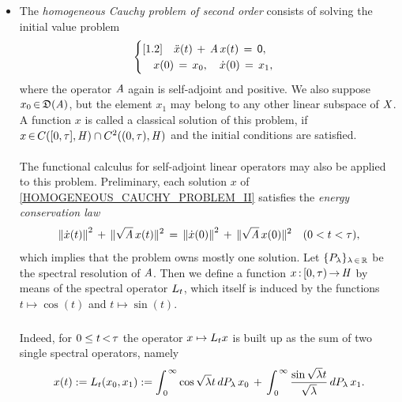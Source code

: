 \documentclass[11pt,twoside]{article}
\begin{document}
\begin{itemize}[leftmargin=12pt,itemsep=2mm,topsep=1mm]
\begin{theorem}\label{EXISTENCE_THEOREM_FOR_ABSTRACT_HEAT_EQUATION}
The function $x\:t \mapsto \linL_t(x_0)$ is continuous in $[0,\infty)$,
continuously differentiable in $(0,\infty)$
and forms a solution of \eqref{HOMOGENEOUS_CAUCHY_PROBLEM_I}.
\end{theorem}

\item[2.] %
The \textit{homogeneous Cauchy problem of second order} consists of solving
the initial value problem
\begin{equation}\label{HOMOGENEOUS_CAUCHY_PROBLEM_II}
\begin{cases}[1.2]
\quad \ddot{x}(t) \,+\, \mathit{A} \, x(t) \,=\, {\mathsf{0}},\\
\quad x(0)  \,=\, x_0,
\quad \dot{x}(0) \,=\, x_1,\\
\end{cases}
\end{equation}
where the operator $\mathit{A}$ again is self-adjoint and positive.
We also suppose $x_0 {\,\in\,} \mathfrak{D}(\mathit{A})$,
but the element $x_1$ may belong to any other linear subspace of $\mathit{X}$.
A function $x$ is called a classical solution of this problem,
if $x {\,\in\,} C([0,\tau],\mathit{H}) \cap C^2((0,\tau),\mathit{H})$
and the initial conditions are satisfied.

\paragraph{} %
The functional calculus for self-adjoint linear operators
may also be applied to this problem.
Preliminary,
each solution $x$ of \eqref{HOMOGENEOUS_CAUCHY_PROBLEM_II} satisfies
the \textit{energy conservation law}
\[
\left\lVert \dot{x}(t) \right\rVert^2 \,+\, \lVert \sqrt{\mathit{A}} \, x(t) \rVert^2
\,=\,
\left\lVert \dot{x}(0) \right\rVert^2 \,+\, \lVert \sqrt{\mathit{A}} \, x(0) \rVert^2
\quad (0 < t < \tau),
\]
which implies that the problem owns mostly one solution.
Let $\{{P}_{\lambda}\}_{\lambda {\,\in\,} {\mathbb{R}}}$ be
the spectral resolution of $\mathit{A}$.
Then we define a function $x {\,:\,} [0,\tau) {\,\to\,} \mathit{H}$
by means of the spectral operator ${L}_t$,
which itself is induced by the functions
$t \mapsto \cos(t)$ and $t \mapsto \sin(t)$.

\subparagraph{}
Indeed,
for $0 \leq t {\,<\,} \tau$
the operator $x \mapsto {L}_t x$ is built up
as the sum of two single spectral operators,
namely
\[
x(t)
:=
{L}_t(x_0,x_1)
:=
\int_{\,0}^{\,\infty} \cos{\sqrt{\lambda}t} \, dP_{\lambda} \, x_0
\,+\,
\int_{\,0}^{\,\infty} \frac{\sin{\sqrt{\lambda}t}}{\sqrt{\lambda}}
\, dP_{\lambda} \, x_1.
\]


\end{itemize}
\end{document}
